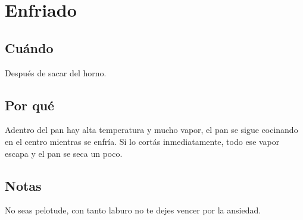 \documentclass[10pt,a4paper]{article}
\begin{document}
\section{Enfriado}
\subsection*{Cuándo}
Después de sacar del horno.
\subsection*{Por qué}
Adentro del pan hay alta temperatura y mucho vapor, el pan se sigue cocinando en
el centro mientras se enfría. Si lo cortás inmediatamente, todo ese vapor escapa
y el pan se seca un poco.
\subsection*{Notas}
No seas pelotude, con tanto laburo no te dejes vencer por la ansiedad.
\end{document}
